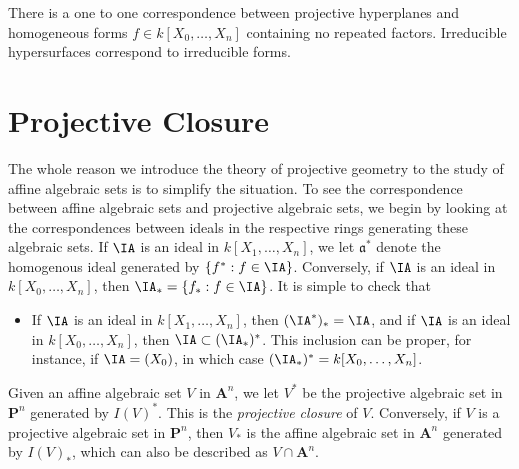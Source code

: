 \begin{corollary}
    There is a one to one correspondence between projective hyperplanes and homogeneous forms $f \in k[X_0,\dots,X_n]$ containing no repeated factors. Irreducible hypersurfaces correspond to irreducible forms.
\end{corollary}

\section{Projective Closure}

The whole reason we introduce the theory of projective geometry to the study of affine algebraic sets is to simplify the situation. To see the correspondence between affine algebraic sets and projective algebraic sets, we begin by looking at the correspondences between ideals in the respective rings generating these algebraic sets. If $\IA$ is an ideal in $k[X_1, \dots, X_n]$, we let $\mathfrak{a}^*$ denote the homogenous ideal generated by $\{ f^* : f \in \IA \}$. Conversely,  if $\IA$ is an ideal in $k[X_0, \dots, X_n]$, then $\IA_* = \{ f_* : f \in \IA \}$. It is simple to check that
%
\begin{itemize}
    \item If $\IA$ is an ideal in $k[X_1,\dots,X_n]$, then $(\IA^*)_* = \IA$, and if $\IA$ is an ideal in $k[X_0,\dots,X_n]$, then $\IA \subset (\IA_*)^*$. This inclusion can be proper, for instance, if $\IA = (X_0)$, in which case $(\IA_*)^* = k[X_0,\dots,X_n]$.
\end{itemize}
%
Given an affine algebraic set $V$ in $\mathbf{A}^n$, we let $V^*$ be the projective algebraic set in $\mathbf{P}^n$ generated by $I(V)^*$. This is the \emph{projective closure} of $V$. Conversely, if $V$ is a projective algebraic set in $\mathbf{P}^n$, then $V_*$ is the affine algebraic set in $\mathbf{A}^n$ generated by $I(V)_*$, which can also be described as $V \cap \mathbf{A}^n$.

